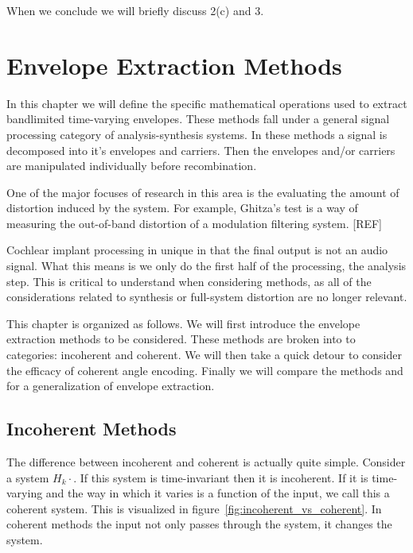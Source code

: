 \documentclass [11pt, proquest] {uwthesis}[2015/03/03]
\begin{document}
When we conclude we will briefly discuss 2(c) and 3.


\chapter{Envelope Extraction Methods}\label{ch:envelope_extraction_chapter}

In this chapter we will define the specific mathematical operations used to extract bandlimited time-varying envelopes.  These methods fall under a general signal processing category of analysis-synthesis systems.  In these methods a signal is decomposed into it's envelopes and carriers.  Then the envelopes and/or carriers are manipulated individually before recombination. 

One of the major focuses of research in this area is the evaluating the amount of distortion induced by the system.  For example, Ghitza's test is a way of measuring the out-of-band distortion of a modulation filtering system. [REF] %

Cochlear implant processing in unique in that the final output is not an audio signal.  What this means is we only do the first half of the processing, the analysis step.  This is critical to understand when considering methods, as all of the considerations related to synthesis or full-system distortion are no longer relevant.

This chapter is organized as follows.  We will first introduce the envelope extraction methods to be considered.  These methods are broken into to categories: incoherent and coherent.  We will then take a quick detour to consider the efficacy of coherent angle encoding.  Finally we will compare the methods and for a generalization of envelope extraction.

\section{Incoherent Methods}

The difference between incoherent and coherent is actually quite simple.  Consider a system $H_k{\cdot}$.  If this system is time-invariant then it is incoherent.  If it is time-varying and the way in which it varies is a function of the input, we call this a coherent system.  This is visualized in figure~\ref{fig:incoherent_vs_coherent}.  In coherent methods the input not only passes through the system, it changes the system.
\end{document}

